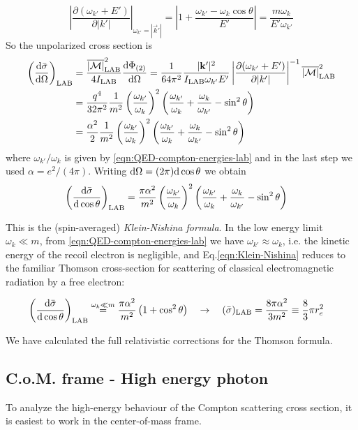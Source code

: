 \documentclass[TheoreticalPhy_ModB.tex]{subfiles}
\begin{document}
\[\left|\frac{\partial(\omega_{k'}+E')}{\partial|k'|}\right|_{\omega_{k'}=|\vec k'|}
=\left|1+\frac{\omega_{k'}-\omega_k\cos\theta}{E'}\right|
=\frac{m\omega_k}{E'\omega_{k'}}
\]
So the unpolarized cross section is 
\begin{align*}
\left(\frac{\textup{d}\bar\sigma}{\textup{d}\Omega}\right)_{\textup{LAB}}&=
\frac{\overline{|\mathcal M|}_{\textup{LAB}}^2}{4I_{\textup{LAB}}}\frac{\textup{d}\Phi_{(2)}}{\textup{d}\Omega}
=\frac1{64\pi^2}\frac{|\mathbf k'|^2}{I_{\textup{LAB}}\omega_{k'}E'}\left|\frac{\partial(\omega_{k'}+E')}{\partial|k'|}\right|^{-1}\overline{|\mathcal M|}_{\textup{LAB}}^2\\
&=\frac{q^4}{32\pi^2}\frac1{m^2}\left(\frac{\omega_{k'}}{\omega_k}\right)^2\left(\frac{\omega_{k'}}{\omega_k}+\frac{\omega_k}{\omega_{k'}}-\sin^2\theta\right)\\
&=\frac{\alpha^2}{2}\frac1{m^2}\left(\frac{\omega_{k'}}{\omega_k}\right)^2\left(\frac{\omega_{k'}}{\omega_k}+\frac{\omega_k}{\omega_{k'}}-\sin^2\theta\right)
\end{align*}
where $\omega_{k'}/\omega_{k}$ is given by \eqref{eqn:QED-compton-energies-lab} and in the last step we used $\alpha=e^2/(4\pi)$. Writing $\textup{d}\Omega=(2\pi)\textup{d}\cos\theta$ we obtain
\begin{align}\label{eqn:Klein-Nishina}
\left(\frac{\textup{d}\bar\sigma}{\textup{d}\cos\theta}\right)_{\textup{LAB}}&=
\frac{\pi\alpha^2}{m^2}\left(\frac{\omega_{k'}}{\omega_k}\right)^2\left(\frac{\omega_{k'}}{\omega_k}+\frac{\omega_k}{\omega_{k'}}-\sin^2\theta\right)
\end{align}

This is the (spin-averaged) \emph{Klein-Nishina formula}.
In the low energy limit $\omega_k\ll m$, from \eqref{eqn:QED-compton-energies-lab} we have $\omega_{k'}\approx\omega_{k}$, i.e. the kinetic energy of the recoil electron is negligible, and Eq.\eqref{eqn:Klein-Nishina} reduces to the familiar Thomson cross-section for scattering of classical electromagnetic radiation by a free electron:

\begin{align*}
\left(\frac{\textup{d}\bar\sigma}{\textup{d}\cos\theta}\right)_{\textup{LAB}}&\overset{\omega_k\ll m}{=}
\frac{\pi\alpha^2}{m^2}\left(1+\cos^2\theta\right)
\quad\rightarrow\quad
(\bar\sigma)_{\textup{LAB}}=\frac{8\pi\alpha^2}{3m^2}\equiv\frac83\pi r_e^2
\end{align*}

We have calculated the full relativistic corrections for the Thomson formula.

\subsection{C.o.M. frame - High energy photon}
To analyze the high-energy behaviour of the Compton scattering cross section, it is easiest to work in the center-of-mass frame.
\end{document}
